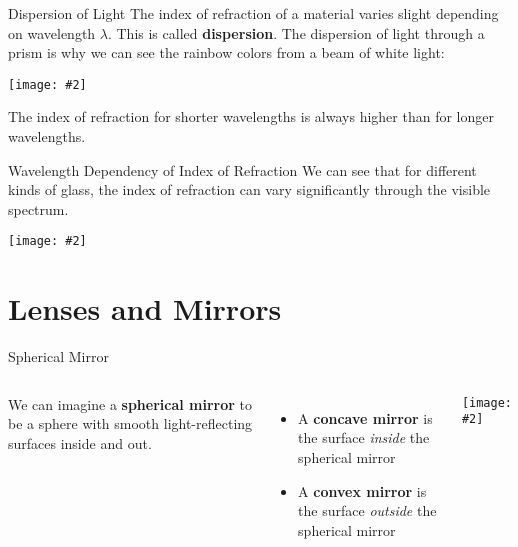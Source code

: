 \documentclass[12pt,compress,aspectratio=169]{beamer}
\newcommand{\pic}[2]{\texttt{[image: \#2]}}
\begin{document}
\begin{frame}{Dispersion of Light}
  The index of refraction of a material varies slight depending on wavelength
  $\lambda$. This is called \textbf{dispersion}. The dispersion of light
  through a prism is why we can see the rainbow colors from a beam of white
  light:
  \begin{center}
    \pic{.3}{graphics/Prism_rainbow_schema.png}
  \end{center}
  The index of refraction for shorter wavelengths is always higher than for
  longer wavelengths.
\end{frame}



\begin{frame}{Wavelength Dependency of Index of Refraction}
  We can see that for different kinds of glass, the index of refraction can vary
  significantly through the visible spectrum.
  \begin{center}
    \pic{.4}{graphics/Dispersion-curve.png}
  \end{center}
\end{frame}



\section{Lenses and Mirrors}

\begin{frame}{Spherical Mirror}
  \begin{columns}
    We can imagine a \textbf{spherical mirror} to be a sphere with smooth
    light-reflecting surfaces inside and out.
    \begin{itemize}
    \item A \textbf{concave mirror} is the surface \emph{inside} the spherical
      mirror
    \item A \textbf{convex mirror} is the surface \emph{outside} the spherical
      mirror
    \end{itemize}
    \pic{1}{graphics/spherical-mirror.png}
  \end{columns}
\end{frame}
\end{document}
